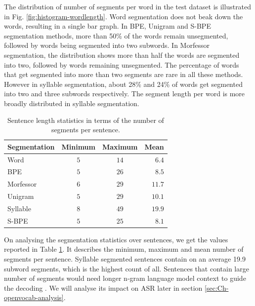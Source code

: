 The distribution of number of segments per word in the test dataset is
illustrated in Fig. \ref{fig:histogram-wordlength}. Word segmentation does not
beak down the words, resulting in a single bar graph. In BPE, Unigram and S-BPE
segmentation methods, more than 50\% of the words remain unsegmented, followed
by words being segmented into two subwords. In Morfessor segmentation, the
distribution shows more than half the words are segmented into two, followed by
words remaining unsegmented. The percentage of words that get segmented into
more than two segments are rare in all these methods. However in syllable
segmentation, about 28\% and 24\% of words get segmented into two and three
subwords respectively. The segment length per word is more broadly distributed
in syllable segmentation.


\begin{table}[htpb]
    \centering
    \caption{Sentence length statistics in terms of the number of segments per sentence.}
    \label{tab:sentenceseg_stat}
    \begin{tabular}{lccr}
        \hline \hline
        \textbf{Segmentation} & \textbf{Minimum} & \textbf{Maximum} & \textbf{Mean} \\
        \hline
        Word                  & $5$              & $14$             & $6.4$         \\
        BPE                   & $5$              & $26$             & $8.5$         \\
        Morfessor             & $6$              & $29$             & $11.7$        \\
        Unigram               & $5$              & $29$             & $10.1$        \\
        Syllable              & $8$              & $49$             & $19.9$        \\
        S-BPE                 & $5$              & $25$             & $8.1$         \\ \hline
    \end{tabular}

\end{table}

On analysing the segmentation statistics over sentences, we get the values
reported in Table \ref{tab:sentenceseg_stat}. It describes the minimum, maximum
and mean number of segments per sentence. Syllable segmented sentences contain
on an average 19.9 subword segments, which is the highest count of all.
Sentences that contain large number of segments would need longer n-gram
language model context to guide the decoding \cite{SMIT2021101158}. We will
analyse its impact on ASR later in section \ref{sec:Ch-openvocab-analysis}.


